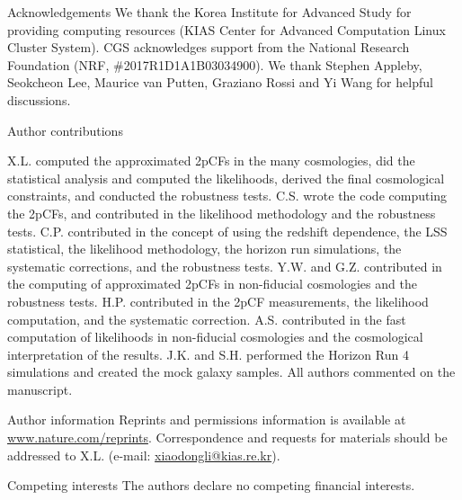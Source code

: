 \documentclass{natureprintstyle}
\begin{document}
\begin{addendum}
\item [Acknowledgements] 
We thank the Korea Institute for Advanced Study for providing computing resources (KIAS Center for Advanced Computation Linux Cluster System).
CGS acknowledges support from the National Research Foundation (NRF,  \#2017R1D1A1B03034900). 
We thank Stephen Appleby, Seokcheon Lee, Maurice van Putten, Graziano Rossi and Yi Wang for helpful discussions.


\item[Author contributions] 

X.L. computed the approximated 2pCFs in the many cosmologies, did the statistical analysis and computed the likelihoods, 
derived the final cosmological constraints, and conducted the robustness tests. 
C.S. wrote the code computing the 2pCFs, and contributed in the likelihood methodology and the robustness tests. 
C.P. contributed in the concept of using the redshift dependence, the LSS statistical, the likelihood methodology,
the horizon run simulations, the systematic corrections, and the robustness tests.
Y.W. and G.Z. contributed in the computing of approximated 2pCFs in non-fiducial cosmologies and the robustness tests.
H.P. contributed in the 2pCF measurements, the likelihood computation, and the systematic correction.
A.S. contributed in the fast computation of likelihoods in non-fiducial cosmologies and the cosmological interpretation of the results.
J.K. and S.H. performed the Horizon Run 4 simulations and created the mock galaxy samples.
All authors commented on the manuscript.


\item[Author information]
Reprints and permissions information is available at \href{www.nature.com/reprints}{www.nature.com/reprints}.
Correspondence and requests for materials should be addressed to X.L. (e-mail: \href{mailto:xiaodongli@kias.re.kr}{xiaodongli@kias.re.kr}).

\item[Competing interests]
The authors declare no competing financial interests.

\end{addendum}



\newpage
\end{document}
